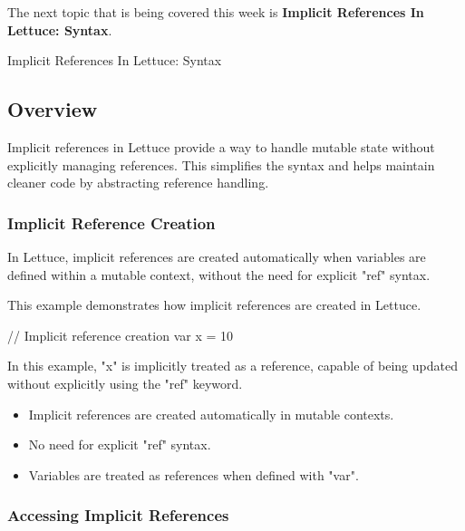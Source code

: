 The next topic that is being covered this week is \textbf{Implicit References In Lettuce: Syntax}.

\begin{notes}{Implicit References In Lettuce: Syntax}
    \subsection*{Overview}

    Implicit references in Lettuce provide a way to handle mutable state without explicitly managing references. This simplifies the syntax and helps maintain cleaner code by abstracting reference handling.
    
    \subsubsection*{Implicit Reference Creation}
    
    In Lettuce, implicit references are created automatically when variables are defined within a mutable context, without the need for explicit "ref" syntax.
    
    \begin{highlight}
    
        This example demonstrates how implicit references are created in Lettuce.
    
    \begin{code}[Lettuce]
    // Implicit reference creation
    var x = 10
    \end{code}
    
        In this example, "x" is implicitly treated as a reference, capable of being updated without explicitly using the "ref" keyword.
    
        \begin{itemize}
            \item Implicit references are created automatically in mutable contexts.
            \item No need for explicit "ref" syntax.
            \item Variables are treated as references when defined with "var".
        \end{itemize}
    
    \end{highlight}
    
    \subsubsection*{Accessing Implicit References}
    

\end{notes}
